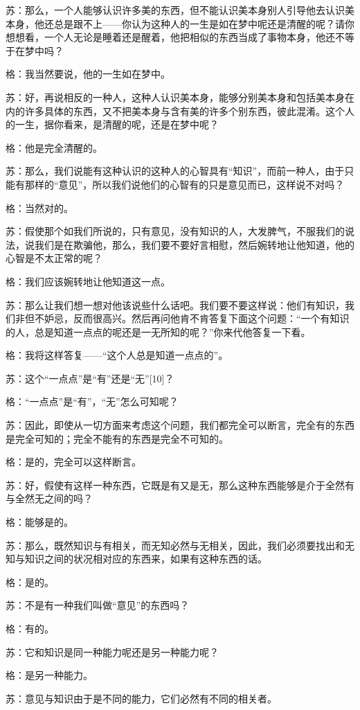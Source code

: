\documentclass[12pt,oneside]{book}
\begin{document}
苏：那么，一个人能够认识许多美的东西，但不能认识美本身别人引导他去认识美本身，他还总是跟不上——你认为这种人的一生是如在梦中呢还是清醒的呢？请你想想看，一个人无论是睡着还是醒着，他把相似的东西当成了事物本身，他还不等于在梦中吗？

格：我当然要说，他的一生如在梦中。

苏：好，再说相反的一种人，这种人认识美本身，能够分别美本身和包括美本身在内的许多具体的东西，又不把美本身与含有美的许多个别东西，彼此混淆。这个人的一生，据你看来，是清醒的呢，还是在梦中呢？

格：他是完全清醒的。

苏：那么，我们说能有这种认识的这种人的心智具有“知识”，而前一种人，由于只能有那样的“意见”，所以我们说他们的心智有的只是意见而已，这样说不对吗？

格：当然对的。

苏：假使那个如我们所说的，只有意见，没有知识的人，大发脾气，不服我们的说法，说我们是在欺骗他，那么，我们要不要好言相慰，然后婉转地让他知道，他的心智是不太正常的呢？

格：我们应该婉转地让他知道这一点。

苏：那么让我们想一想对他该说些什么话吧。我们要不要这样说：他们有知识，我们非但不妒忌，反而很高兴。然后再问他肯不肯答复下面这个问题：“一个有知识的人，总是知道一点点的呢还是一无所知的呢？”你来代他答复一下看。

格：我将这样答复——“这个人总是知道一点点的”。

苏：这个“一点点”是“有”还是“无”[10]？

格：“一点点”是“有”，“无”怎么可知呢？

苏：因此，即使从一切方面来考虑这个问题，我们都完全可以断言，完全有的东西是完全可知的；完全不能有的东西是完全不可知的。

格：是的，完全可以这样断言。

苏：好，假使有这样一种东西，它既是有又是无，那么这种东西能够是介于全然有与全然无之间的吗？

格：能够是的。

苏：那么，既然知识与有相关，而无知必然与无相关，因此，我们必须要找出和无知与知识之间的状况相对应的东西来，如果有这种东西的话。

格：是的。

苏：不是有一种我们叫做“意见”的东西吗？

格：有的。

苏：它和知识是同一种能力呢还是另一种能力呢？

格：是另一种能力。

苏：意见与知识由于是不同的能力，它们必然有不同的相关者。
\end{document}
